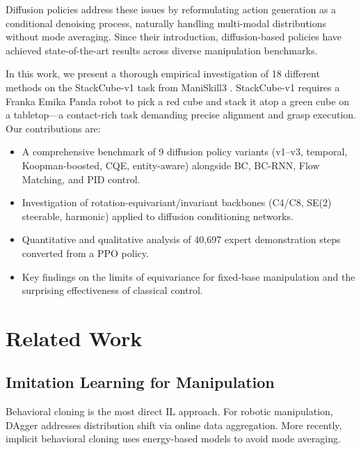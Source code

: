 \documentclass[twocolumn]{article}
\begin{document}
Diffusion policies \cite{chi2023diffusion} address these issues by reformulating action generation as a conditional denoising process, naturally handling multi-modal distributions without mode averaging. Since their introduction, diffusion-based policies have achieved state-of-the-art results across diverse manipulation benchmarks.

In this work, we present a thorough empirical investigation of 18 different methods on the StackCube-v1 task from ManiSkill3 \cite{tao2025maniskill3}. StackCube-v1 requires a Franka Emika Panda robot to pick a red cube and stack it atop a green cube on a tabletop---a contact-rich task demanding precise alignment and grasp execution. Our contributions are:

\begin{itemize}
    \item A comprehensive benchmark of 9 diffusion policy variants (v1--v3, temporal, Koopman-boosted, CQE, entity-aware) alongside BC, BC-RNN, Flow Matching, and PID control.
    \item Investigation of rotation-equivariant/invariant backbones (C4/C8, SE(2) steerable, harmonic) applied to diffusion conditioning networks.
    \item Quantitative and qualitative analysis of 40,697 expert demonstration steps converted from a PPO policy.
    \item Key findings on the limits of equivariance for fixed-base manipulation and the surprising effectiveness of classical control.
\end{itemize}

\section{Related Work}

\subsection{Imitation Learning for Manipulation}
Behavioral cloning \cite{pomerleau1991efficient} is the most direct IL approach. For robotic manipulation, DAgger \cite{ross2011reduction} addresses distribution shift via online data aggregation. More recently, implicit behavioral cloning \cite{florence2022implicit} uses energy-based models to avoid mode averaging.
\end{document}
